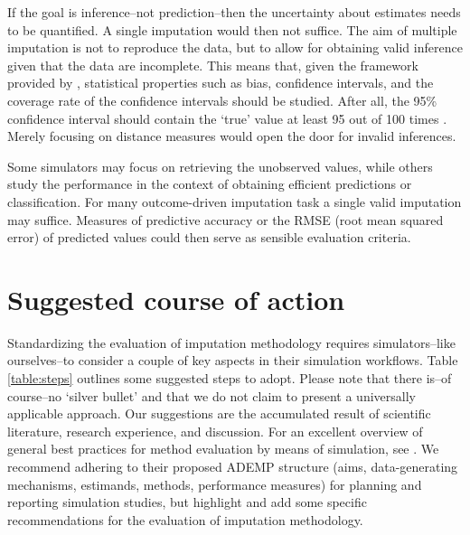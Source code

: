 \documentclass[bimj,fleqn]{w-art}
\begin{document}
If the goal is inference--not prediction--then the uncertainty about estimates needs to be quantified. A single imputation would then not suffice. The aim of multiple imputation is not to reproduce the data, but to allow for obtaining valid inference given that the data are incomplete. This means that, given the framework provided by \citet{rubi87}, statistical properties such as bias, confidence intervals, and the coverage rate of the confidence intervals should be studied. After all, the 95\% confidence interval should contain the `true' value at least 95 out of 100 times \citep[][p. 591]{neym34}. Merely focusing on distance measures would open the door for invalid inferences.

Some simulators may focus on retrieving the unobserved values, while others study the performance in the context of obtaining efficient predictions or classification. For many outcome-driven imputation task a single valid imputation may suffice. Measures of predictive accuracy or the RMSE (root mean squared error) of predicted values could then serve as sensible evaluation criteria.


\section{Suggested course of action}

Standardizing the evaluation of imputation methodology requires simulators--like ourselves--to consider a couple of key aspects in their simulation workflows. Table \ref{table:steps} outlines some suggested steps to adopt. Please note that there is--of course--no `silver bullet' and that we do not claim to present a universally applicable approach. Our suggestions are the accumulated result of scientific literature, research experience, and discussion. For an excellent overview of general best practices for method evaluation by means of simulation, see \citet{morr18}. We recommend adhering to their proposed ADEMP structure (aims, data-generating mechanisms, estimands, methods, performance measures) for planning and reporting simulation studies, but highlight and add some specific recommendations for the evaluation of imputation methodology.
\end{document}
